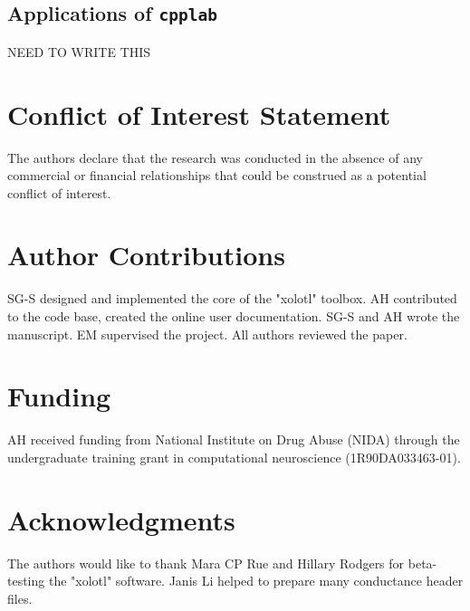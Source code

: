 \documentclass{frontiersSCNS} %
\begin{document}
\subsection{Applications of \texttt{cpplab}}

NEED TO WRITE THIS




%
%
%
%
%
%


\section*{Conflict of Interest Statement}

The authors declare that the research was conducted in the absence of any commercial or financial relationships that could be construed as a potential conflict of interest.

\section*{Author Contributions}

SG-S designed and implemented the core of the "xolotl" toolbox. AH contributed to the code base, created the online user documentation. SG-S and AH wrote the manuscript. EM supervised the project. All authors reviewed the paper.

\section*{Funding}

AH received funding from National Institute on Drug Abuse (NIDA) through the undergraduate training grant in computational neuroscience (1R90DA033463-01).

\section*{Acknowledgments}
The authors would like to thank Mara CP Rue and Hillary Rodgers for beta-testing the "xolotl" software. Janis Li helped to prepare many conductance header files.
\end{document}
